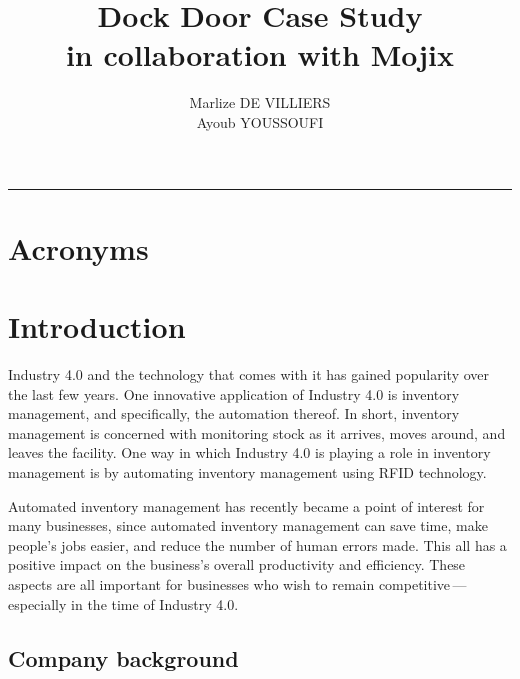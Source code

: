\documentclass{article}
\title{Dock Door Case Study\\
\normalsize{in collaboration with Mojix}}
\author{Marlize DE VILLIERS \\
Ayoub YOUSSOUFI}
\begin{document}
\maketitle

\hrule

\tableofcontents

\listoftables{}
\listoffigures{}

\section*{Acronyms}
\begin{acronym}[ABCDEF]
\end{acronym}

\clearpage

\section{Introduction}

Industry 4.0 and the technology that comes with it has gained popularity over the last few years.
One innovative application of Industry 4.0 is inventory management, and specifically, the automation thereof.
In short, inventory management is concerned with monitoring stock as it arrives, moves around, and leaves the facility.
One way in which Industry 4.0 is playing a role in inventory management is by automating inventory management using \ac{RFID} technology.

Automated inventory management has recently became a point of interest for many businesses, since automated inventory management can save time, make people's jobs easier, and reduce the number of human errors made.
This all has a positive impact on the business's overall productivity and efficiency.
These aspects are all important for businesses who wish to remain competitive\,---\,especially in the time of Industry 4.0.

\subsection{Company background}
\end{document}
